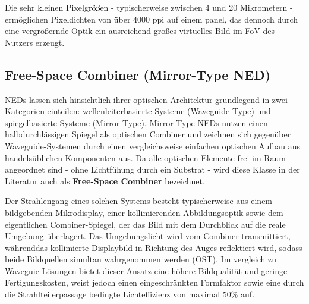 Die sehr kleinen Pixelgrößen - typischerweise zwischen 4 und 20 Mikrometern - ermöglichen Pixeldichten von über 4000 ppi auf einem panel, das dennoch durch eine vergrößernde Optik ein ausreichend großes virtuelles Bild im FoV des Nutzers erzeugt.\autocite[vgl. ]{ARDisplayLuminance2021}

\subsection{Free-Space Combiner (Mirror-Type NED)}
\label{subsec:FreeSpaceCombiner}
\ac{NED}s lassen sich hinsichtlich ihrer optischen Architektur grundlegend in zwei Kategorien einteilen: wellenleiterbasierte Systeme (Waveguide-Type) und spiegelbasierte Systeme (Mirror-Type). Mirror-Type \ac{NED}s nutzen einen halbdurchlässigen Spiegel als optischen Combiner und zeichnen sich gegenüber Waveguide-Systemen durch einen vergleichsweise einfachen optischen Aufbau aus handelsüblichen Komponenten aus. Da alle optischen Elemente frei im Raum angeordnet sind - ohne Lichtfühung durch ein Substrat - wird diese Klasse in der Literatur auch als \textbf{Free-Space Combiner} bezeichnet.\autocite[vgl. S.101 ff.]{cOpticalArchitecturesAugmented}

Der Strahlengang eines solchen Systems besteht typischerweise aus einem bildgebenden Mikrodisplay, einer kollimierenden Abbildungsoptik sowie dem eigentlichen Combiner-Spiegel, der das Bild mit dem Durchblick auf die reale Umgebung überlagert. Das Umgebungslicht wird vom Combiner transmittiert, währenddas kollimierte Displaybild in Richtung des Auges reflektiert wird, sodass beide Bildquellen simultan wahrgenommen werden (\ac{OST}). Im vergleich zu Waveguie-Lösungen bietet dieser Ansatz eine höhere Bildqualität und geringe Fertigungskosten, weist jedoch einen eingeschränkten Formfaktor sowie eine durch die Strahlteilerpassage bedingte Lichteffizienz von maximal 50\% auf. \autocite[vgl.]{hongSeeopticalCombinerAugmented2017} \autocite[vgl.]{ThorlabsBeamsplitterGuide} 

\newpage

